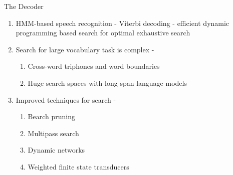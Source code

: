 \begin{frame}{The Decoder}
\begin{enumerate}
\item HMM-based speech recognition - \alert{Viterbi decoding} - efficient dynamic programming based 
search for optimal exhaustive search
\item Search for large vocabulary task is \alert{complex} -
\begin{enumerate}
\item Cross-word triphones and word boundaries
\item Huge search spaces with long-span language models
\end{enumerate}
\item Improved techniques for search -
\begin{enumerate}
\item Bearch pruning
\item Multipass search
\item Dynamic networks
\item Weighted finite state transducers
\end{enumerate}
\end{enumerate}
\end{frame}

